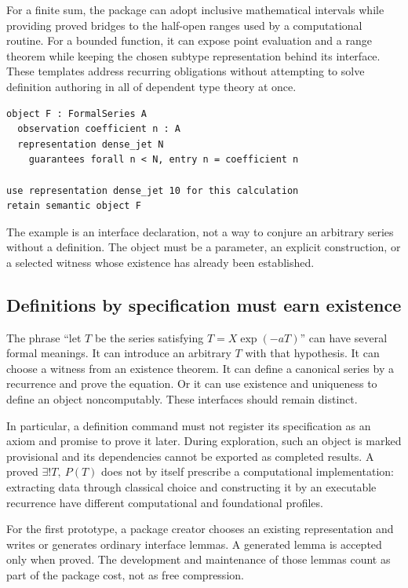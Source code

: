 \documentclass[11pt,letterpaper]{article}
\theoremstyle{definition}
\begin{document}
For a finite sum, the package can adopt inclusive mathematical intervals while
providing proved bridges to the half-open ranges used by a computational routine.
For a bounded function, it can expose point evaluation and a range theorem while
keeping the chosen subtype representation behind its interface. These templates
address recurring obligations without attempting to solve definition authoring
in all of dependent type theory at once.

\begin{lstlisting}
object F : FormalSeries A
  observation coefficient n : A
  representation dense_jet N
    guarantees forall n < N, entry n = coefficient n

use representation dense_jet 10 for this calculation
retain semantic object F
\end{lstlisting}

The example is an interface declaration, not a way to conjure an arbitrary series
without a definition. The object must be a parameter, an explicit construction,
or a selected witness whose existence has already been established.

\subsection{Definitions by specification must earn existence}
The phrase ``let \(T\) be the series satisfying \(T=X\exp(-aT)\)'' can have several
formal meanings. It can introduce an arbitrary \(T\) with that hypothesis. It can
choose a witness from an existence theorem. It can define a canonical series by a
recurrence and prove the equation. Or it can use existence and uniqueness to define
an object noncomputably. These interfaces should remain distinct.

In particular, a definition command must not register its specification as an
axiom and promise to prove it later. During exploration, such an object is marked
provisional and its dependencies cannot be exported as completed results. A proved
\(\exists!T,\ P(T)\) does not by itself prescribe a computational implementation:
extracting data through classical choice and constructing it by an executable
recurrence have different computational and foundational profiles.

For the first prototype, a package creator chooses an existing representation
and writes or generates ordinary interface lemmas. A generated lemma is accepted
only when proved. The development and maintenance of those lemmas count as part
of the package cost, not as free compression.
\end{document}
